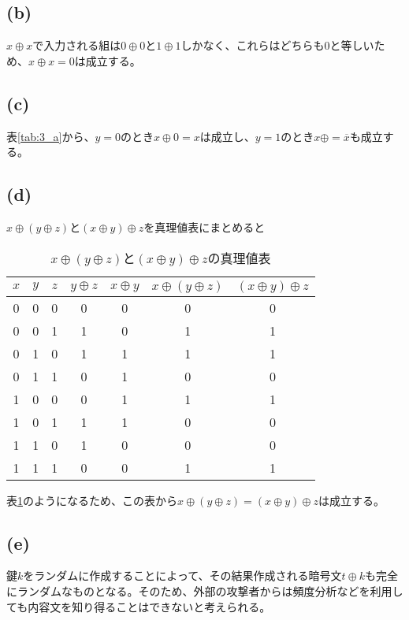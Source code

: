 \documentclass{jsarticle}
\begin{document}
    \subsection{(b)}
    $x \oplus x$で入力される組は$0 \oplus 0$と$1 \oplus 1$しかなく、これらはどちらも0と等しいため、$x \oplus x = 0$は成立する。

    \subsection{(c)}
    表\ref{tab:3_a}から、$y=0$のとき$x \oplus 0 = x$は成立し、$y=1$のとき$x \oplus = \overline{x}$も成立する。

    \subsection{(d)}
    $x \oplus (y \oplus z)と(x \oplus y) \oplus z$を真理値表にまとめると
    \begin{table}[H]
      \caption{$x \oplus (y \oplus z)と(x \oplus y) \oplus z$の真理値表}
      \label{tab:3_d}
      \centering
      \begin{tabular}{|c|c|c|c|c|c|c|} \hline
        $x$ & $y$ & $z$ & $y \oplus z$ & $x \oplus y$ & $x \oplus (y \oplus z)$ & $(x \oplus y) \oplus z$\\ \hline
        0 & 0 & 0 & 0 & 0 & 0 & 0 \\
        0 & 0 & 1 & 1 & 0 & 1 & 1 \\
        0 & 1 & 0 & 1 & 1 & 1 & 1 \\
        0 & 1 & 1 & 0 & 1 & 0 & 0 \\
        1 & 0 & 0 & 0 & 1 & 1 & 1 \\
        1 & 0 & 1 & 1 & 1 & 0 & 0 \\
        1 & 1 & 0 & 1 & 0 & 0 & 0 \\
        1 & 1 & 1 & 0 & 0 & 1 & 1 \\ \hline
      \end{tabular}
    \end{table}
    表\ref{tab:3_d}のようになるため、この表から$x \oplus (y \oplus z)=(x \oplus y) \oplus z$は成立する。

    \subsection{(e)}
    鍵$k$をランダムに作成することによって、その結果作成される暗号文$t \oplus k$も完全にランダムなものとなる。そのため、外部の攻撃者からは頻度分析などを利用しても内容文を知り得ることはできないと考えられる。
\end{document}
